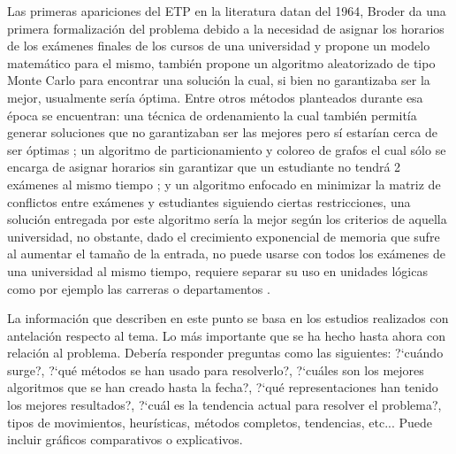\documentclass[letter, 10pt]{article}
\begin{document}
Las primeras apariciones del ETP en la literatura datan del 1964, Broder \cite{10.1145/355586.364824} da una primera formalización del problema debido a la necesidad de asignar los horarios de los exámenes finales de los cursos de una universidad y propone un modelo matemático para el mismo, también propone un algoritmo aleatorizado de tipo Monte Carlo para encontrar una solución la cual, si bien no garantizaba ser la mejor, usualmente sería óptima. Entre otros métodos planteados durante esa época se encuentran: una técnica de ordenamiento la cual también permitía generar soluciones que no garantizaban ser las mejores pero sí estarían cerca de ser óptimas \cite{10.1093/comjnl/7.2.117}; un algoritmo de particionamiento y coloreo de grafos el cual sólo se encarga de asignar horarios sin garantizar que un estudiante no tendrá 2 exámenes al mismo tiempo \cite{10.1145/365696.365713}; y un algoritmo enfocado en minimizar la matriz de conflictos entre exámenes y estudiantes siguiendo ciertas restricciones, una solución entregada por este algoritmo sería la mejor según los criterios de aquella universidad, no obstante, dado el crecimiento exponencial de memoria que sufre al aumentar el tamaño de la entrada, no puede usarse con todos los exámenes de una universidad al mismo tiempo, requiere separar su uso en unidades lógicas como por ejemplo las carreras o departamentos \cite{10.1093/comjnl/11.1.41}. 


La informaci\'on que describen en este punto se basa en los estudios realizados con antelaci\'on respecto al tema.
Lo m\'as importante que se ha hecho hasta ahora con relaci\'on al problema. Deber\'ia responder preguntas como las siguientes:
?`cu\'ando surge?, ?`qu\'e m\'etodos se han usado para resolverlo?, ?`cu\'ales son los mejores algoritmos que se han creado hasta
la fecha?, ?`qu\'e representaciones han tenido los mejores resultados?, ?`cu\'al es la tendencia actual para resolver el problema?, tipos de movimientos, heur\'isticas, m\'etodos completos, tendencias, etc... Puede incluir gr\'aficos comparativos o explicativos.\\


\begin{table}[]
\centering
{}
\caption{Principales restricciones duras en ETP \cite{Qu2009}}
\label{tab:duras}
\end{table}
\end{document}

